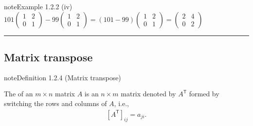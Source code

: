 \documentclass[letterpaper,10pt,english]{jupyterBook}
\begin{document}
\begin{sphinxadmonition}{note}{Example 1.2.2}
\sphinxAtStartPar
(iv)   \(101 \begin{pmatrix} 1 & 2 \\ 0 & 1 \end{pmatrix} - 99 \begin{pmatrix} 1 & 2 \\ 0 & 1 \end{pmatrix} = (101 - 99) \begin{pmatrix} 1 & 2 \\ 0 & 1 \end{pmatrix} = \begin{pmatrix} 2 & 4 \\ 0 & 2 \end{pmatrix}\)
\end{sphinxadmonition}


\bigskip\hrule\bigskip


\ignorespaces 

\subsection{Matrix transpose}
\label{\detokenize{_pages/1.1_Matrix_operations:matrix-transpose}}\label{\detokenize{_pages/1.1_Matrix_operations:index-3}}\label{_pages/1.1_Matrix_operations:matrix-transpose-definition}
\begin{sphinxadmonition}{note}{Definition 1.2.4 (Matrix transpose)}



\sphinxAtStartPar
The  of an \(m \times n\) matrix \(A\) is an \(n \times m\) matrix denoted by \(A^\mathsf{T}\) formed by switching the rows and columns of \(A\), i.e.,
\begin{equation}\label{equation:_pages/1.1_Matrix_operations:matrix-transpose-equation}
\begin{split} [A^\mathsf{T}]_{ij}=a_{ji}. \end{split}
\end{equation}\end{sphinxadmonition}
\end{document}
